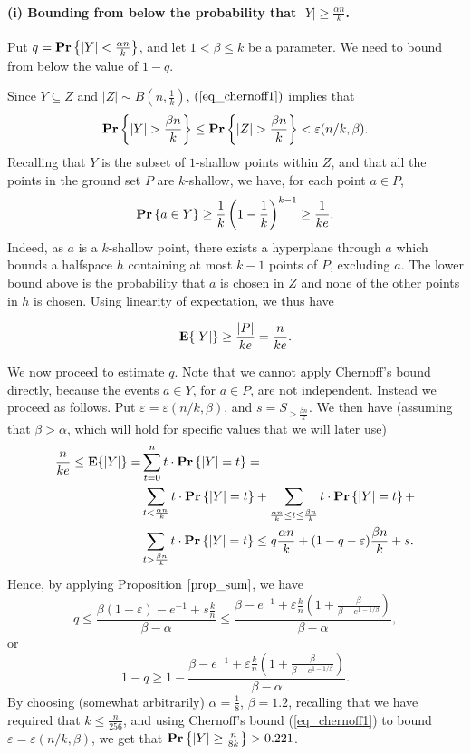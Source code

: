 \documentclass[11pt]{article}
\def\eps{\varepsilon}
\begin{document}
\paragraph{(i) Bounding from below the probability that $|Y| \geq \frac{\alpha n}{k}$.}
Put $q = {\bf Pr}\left\{|Y| < \frac{\alpha n}{k} \right\}$, and let $1 < \beta \leq k$ be a parameter. We need to bound from below the value of $1-q$.

Since $Y \subseteq Z$ and $|Z| \sim B(n,\frac{1}{k})$, $(\ref{eq_chernoff1})$ implies that
\begin{equation} \label{eq1}
{\bf Pr}\left\{|Y| > \frac{\beta n}{k}\right\} \leq  {\bf Pr}\left\{|Z| > \frac{\beta n}{k}\right\} < \eps(n/k, \beta).
\end{equation}
Recalling that $Y$ is the subset of $1$-shallow points within $Z$, and that all the points in the ground set $P$ are $k$-shallow, we have, for each point $a\in P$,
$$ {\bf Pr}\left\{a \in Y \right\} \geq \frac{1}{k}\left(1-\frac{1}{k}\right)^{k-1} \geq \frac{1}{ke}. $$
Indeed, as $a$ is a $k$-shallow point, there exists a hyperplane through $a$ which bounds a halfspace $h$ containing at most $k-1$ points of $P$, excluding $a$. The lower bound above is the probability that $a$ is chosen in $Z$ and none of the other points in $h$ is chosen. Using linearity of expectation, we thus have

\begin{equation}\label{eq2}
{\bf E}\{|Y|\} \geq \frac{|P|}{ke} = \frac{n}{ke}.
\end{equation}

We now proceed to estimate $q$. Note that we cannot apply Chernoff's bound directly, because the events $a \in Y$, for $a \in P$, are not independent. Instead we proceed as follows. Put $\eps = \eps(n/k,\beta)$, and  $s = S_{> \frac{\beta n}{k}}$. We then have (assuming that $\beta > \alpha$, which will hold for specific values that we will later use)
\begin{align*}
\frac{n}{ke} \leq {\bf E}\{|Y|\} =& \sum_{t=0}^n t\cdot {\bf Pr}\left\{|Y|=t\right\} = \\
&\sum_{t < \frac{\alpha n}{k}} t\cdot {\bf Pr}\left\{|Y|=t \right\} +
\sum_{\frac{\alpha n}{k} \leq t \leq \frac{\beta n}{k}} t\cdot {\bf Pr}\left\{|Y|=t\right\} + \\
&\sum_{t > \frac{\beta n}{k}} t\cdot {\bf Pr}\left\{|Y|=t \right\} \leq
q\frac{\alpha n}{k} + (1-q-\eps)\frac{\beta n}{k} + s.
\end{align*}
Hence, by applying Proposition $\ref{prop_sum}$, we have
$$
q \leq \frac{\beta(1-\eps) - e^{-1} + s\frac{k}{n}}{\beta-\alpha} \leq
\frac{\beta - e^{-1} + \eps\frac{k}{n}\left(1 + \frac{\beta}{\beta - e^{1-1/\beta}}\right)}{\beta-\alpha},
$$
or
\begin{equation} \label{eq_sample_k}
1-q \geq 1 - \frac{\beta - e^{-1} + \eps\frac{k}{n}\left(1 + \frac{\beta}{\beta - e^{1-1/\beta}}\right)}{\beta-\alpha}.
\end{equation}
By choosing (somewhat arbitrarily) $\alpha = \frac{1}{8}$, $\beta = 1.2$, recalling that we have required that $k \leq \frac{n}{256}$, and using Chernoff's bound (\ref{eq_chernoff1}) to bound $\eps = \eps(n/k,\beta)$, we get that ${\bf Pr}\left\{|Y| \geq \frac{n}{8k}\right\} > 0.221$.
\end{document}
